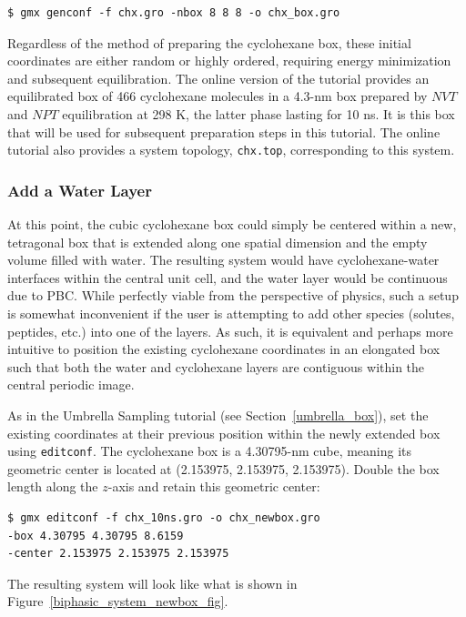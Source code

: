 \documentclass[9pt,tutorial]{livecoms}
\begin{document}
\begin{verbatim}
$ gmx genconf -f chx.gro -nbox 8 8 8 -o chx_box.gro
\end{verbatim}

Regardless of the method of preparing the cyclohexane box, these initial coordinates are either random or highly ordered, requiring energy minimization and subsequent equilibration. The online version of the tutorial provides an equilibrated box of 466 cyclohexane molecules in a 4.3-nm box prepared by $NVT$ and $NPT$ equilibration at 298 K, the latter phase lasting for 10 ns. It is this box that will be used for subsequent preparation steps in this tutorial. The online tutorial also provides a system topology, \texttt{chx.top}, corresponding to this system.

\subsubsection{Add a Water Layer} \label{biphasic_water}

At this point, the cubic cyclohexane box could simply be centered within a new, tetragonal box that is extended along one spatial dimension and the empty volume filled with water. The resulting system would have cyclohexane-water interfaces within the central unit cell, and the water layer would be continuous due to PBC. While perfectly viable from the perspective of physics, such a setup is somewhat inconvenient if the user is attempting to add other species (solutes, peptides, etc.) into one of the layers. As such, it is equivalent and perhaps more intuitive to position the existing cyclohexane coordinates in an elongated box such that both the water and cyclohexane layers are contiguous within the central periodic image.

As in the Umbrella Sampling tutorial (see Section~\ref{umbrella_box}), set the existing coordinates at their previous position within the newly extended box using \texttt{editconf}. The cyclohexane box is a 4.30795-nm cube, meaning its geometric center is located at (2.153975, 2.153975, 2.153975). Double the box length along the $z$-axis and retain this geometric center:

\begin{verbatim}
$ gmx editconf -f chx_10ns.gro -o chx_newbox.gro
-box 4.30795 4.30795 8.6159
-center 2.153975 2.153975 2.153975
\end{verbatim}

The resulting system will look like what is shown in Figure~\ref{biphasic_system_newbox_fig}.
\end{document}
